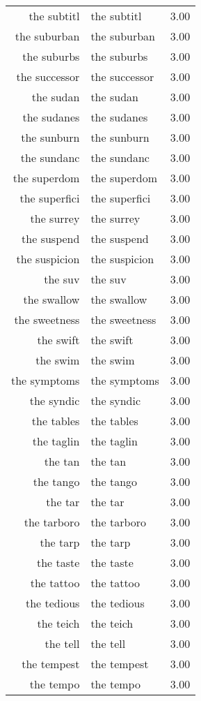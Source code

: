 \begin{table}[ht]
\begin{tabular}{rlr}
  the subtitl & the subtitl & 3.00 \\ 
  the suburban & the suburban & 3.00 \\ 
  the suburbs & the suburbs & 3.00 \\ 
  the successor & the successor & 3.00 \\ 
  the sudan & the sudan & 3.00 \\ 
  the sudanes & the sudanes & 3.00 \\ 
  the sunburn & the sunburn & 3.00 \\ 
  the sundanc & the sundanc & 3.00 \\ 
  the superdom & the superdom & 3.00 \\ 
  the superfici & the superfici & 3.00 \\ 
  the surrey & the surrey & 3.00 \\ 
  the suspend & the suspend & 3.00 \\ 
  the suspicion & the suspicion & 3.00 \\ 
  the suv & the suv & 3.00 \\ 
  the swallow & the swallow & 3.00 \\ 
  the sweetness & the sweetness & 3.00 \\ 
  the swift & the swift & 3.00 \\ 
  the swim & the swim & 3.00 \\ 
  the symptoms & the symptoms & 3.00 \\ 
  the syndic & the syndic & 3.00 \\ 
  the tables & the tables & 3.00 \\ 
  the taglin & the taglin & 3.00 \\ 
  the tan & the tan & 3.00 \\ 
  the tango & the tango & 3.00 \\ 
  the tar & the tar & 3.00 \\ 
  the tarboro & the tarboro & 3.00 \\ 
  the tarp & the tarp & 3.00 \\ 
  the taste & the taste & 3.00 \\ 
  the tattoo & the tattoo & 3.00 \\ 
  the tedious & the tedious & 3.00 \\ 
  the teich & the teich & 3.00 \\ 
  the tell & the tell & 3.00 \\ 
  the tempest & the tempest & 3.00 \\ 
  the tempo & the tempo & 3.00 \\ 

\end{tabular}
\end{table}
